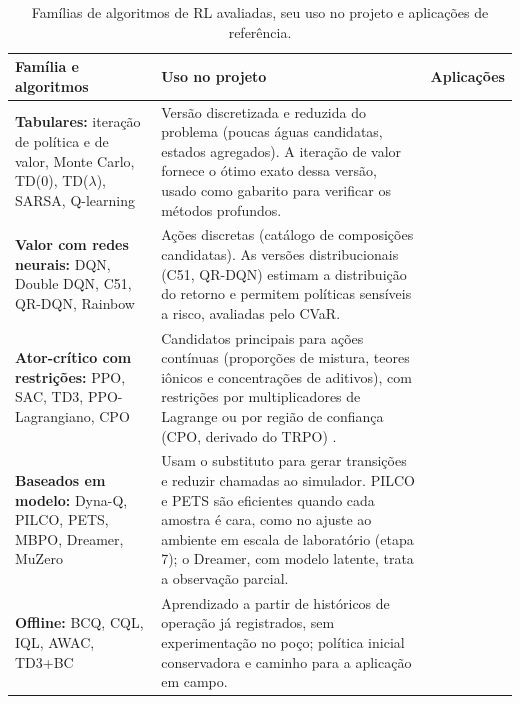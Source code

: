\documentclass[10pt,a4paper]{article}
\begin{document}
\begin{table}[!htbp]
\centering
\footnotesize
{}
\caption{Famílias de algoritmos de RL avaliadas, seu uso no projeto e aplicações de referência.}
\label{tab:rl}
\begin{tabularx}{\textwidth}{@{}>{\raggedright\arraybackslash}p{}>{\raggedright\arraybackslash}X>{\raggedright\arraybackslash}p{}@{}}
\toprule
\textbf{Família e algoritmos} & \textbf{Uso no projeto} & \textbf{Aplicações} \\
\midrule
\textbf{Tabulares:} iteração de política e de valor, Monte Carlo, TD(0), TD($\lambda$), SARSA, Q-learning
 & Versão discretizada e reduzida do problema (poucas águas candidatas, estados agregados). A iteração de valor fornece o ótimo exato dessa versão, usado como gabarito para verificar os métodos profundos.
 & \cite{sutton2018rl,jin2026wag,alvarez2024dss,rizvi2023jas} \\
\addlinespace
\textbf{Valor com redes neurais:} DQN, Double DQN, C51, QR-DQN, Rainbow
 & Ações discretas (catálogo de composições candidatas). As versões distribucionais (C51, QR-DQN) estimam a distribuição do retorno e permitem políticas sensíveis a risco, avaliadas pelo CVaR.
 & \cite{mnih2015dqn,dabney2018qrdqn,fang2022hvac} \\
\addlinespace
\textbf{Ator-crítico com restrições:} PPO, SAC, TD3, PPO-Lagrangiano, CPO
 & Candidatos principais para ações contínuas (proporções de mistura, teores iônicos e concentrações de aditivos), com restrições por multiplicadores de Lagrange \cite{ray2019} ou por região de confiança (CPO, derivado do TRPO) \cite{achiam2017}.
 & \cite{tan2023pcod,haarnoja2018,schulman2017,schulman2015trpo,sac2025,silvestri2024} \\
\addlinespace
\textbf{Baseados em modelo:} Dyna-Q, PILCO, PETS, MBPO, Dreamer, MuZero
 & Usam o substituto para gerar transições e reduzir chamadas ao simulador. PILCO e PETS são eficientes quando cada amostra é cara, como no ajuste ao ambiente em escala de laboratório (etapa 7); o Dreamer, com modelo latente, trata a observação parcial.
 & \cite{janner2019,hafner2020dreamer,zhang2026dosing,ye2025mbrl} \\
\addlinespace
\textbf{Offline:} BCQ, CQL, IQL, AWAC, TD3+BC
 & Aprendizado a partir de históricos de operação já registrados, sem experimentação no poço; política inicial conservadora e caminho para a aplicação em campo.
 & \cite{kumar2020cql,kostrikov2022iql,nair2020awac} \\
\bottomrule
\end{tabularx}
\end{table}
\end{document}
